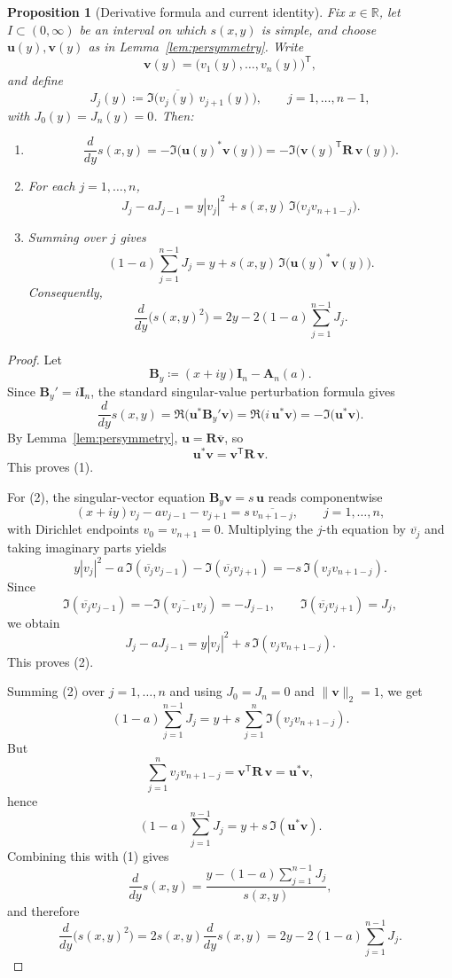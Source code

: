 \documentclass[11pt]{article}
\newtheorem{proposition}[theorem]{Proposition}
\begin{document}
\begin{proposition}[Derivative formula and current identity]\label{prop:current-identity}
Fix \(x\in\mathbb R\), let \(I\subset(0,\infty)\) be an interval on which \(s(x,y)\) is simple, and choose \(\mathbf u(y),\mathbf v(y)\) as in Lemma~\ref{lem:persymmetry}.  Write
\[
\mathbf v(y)=\bigl(v_1(y),\dots,v_n(y)\bigr)^{\mathsf T},
\]
and define
\[
J_j(y)\coloneqq \Im\!\bigl(\overline{v_j(y)}\,v_{j+1}(y)\bigr),
\qquad
j=1,\dots,n-1,
\]
with \(J_0(y)=J_n(y)=0\). Then:
\begin{enumerate}
\item
\[
\frac{d}{dy}s(x,y)
=
-\Im\!\bigl(\mathbf u(y)^*\mathbf v(y)\bigr)
=
-\Im\!\bigl(\mathbf v(y)^{\mathsf T}\mathbf R\,\mathbf v(y)\bigr).
\]
\item For each \(j=1,\dots,n\),
\[
J_j-aJ_{j-1}
=
y|v_j|^2+s(x,y)\,\Im\!\bigl(v_jv_{n+1-j}\bigr).
\]
\item Summing over \(j\) gives
\[
(1-a)\sum_{j=1}^{n-1}J_j
=
y+s(x,y)\,\Im\!\bigl(\mathbf u(y)^*\mathbf v(y)\bigr).
\]
Consequently,
\[
\frac{d}{dy}\bigl(s(x,y)^2\bigr)
=
2y-2(1-a)\sum_{j=1}^{n-1}J_j.
\]
\end{enumerate}
\end{proposition}

\begin{proof}
Let
\[
\mathbf B_y\coloneqq (x+iy)\mathbf I_n-\mathbf A_n(a).
\]
Since \(\mathbf B_y' = i\mathbf I_n\), the standard singular-value perturbation formula gives
\[
\frac{d}{dy}s(x,y)
=
\Re\!\bigl(\mathbf u^* \mathbf B_y' \mathbf v\bigr)
=
\Re\!\bigl(i\,\mathbf u^*\mathbf v\bigr)
=
-\Im\!\bigl(\mathbf u^*\mathbf v\bigr).
\]
By Lemma~\ref{lem:persymmetry}, \(\mathbf u=\mathbf R\overline{\mathbf v}\), so
\[
\mathbf u^*\mathbf v
=
\mathbf v^{\mathsf T}\mathbf R\,\mathbf v.
\]
This proves (1).

For (2), the singular-vector equation \(\mathbf B_y\mathbf v=s\,\mathbf u\) reads
componentwise
\[
(x+iy)v_j-a v_{j-1}-v_{j+1}
=
s\,\overline{v_{n+1-j}},
\qquad
j=1,\dots,n,
\]
with Dirichlet endpoints \(v_0=v_{n+1}=0\). Multiplying the \(j\)-th equation by \(\overline{v_j}\) and taking imaginary parts yields
\[
y|v_j|^2-a\,\Im(\overline{v_j}v_{j-1})-\Im(\overline{v_j}v_{j+1})
=
-s\,\Im(v_jv_{n+1-j}).
\]
Since
\[
\Im(\overline{v_j}v_{j-1})=-\Im(\overline{v_{j-1}}v_j)=-J_{j-1},
\qquad
\Im(\overline{v_j}v_{j+1})=J_j,
\]
we obtain
\[
J_j-aJ_{j-1}
=
y|v_j|^2+s\,\Im(v_jv_{n+1-j}).
\]
This proves (2).

Summing (2) over \(j=1,\dots,n\) and using \(J_0=J_n=0\) and \(\|\mathbf v\|_2=1\), we get
\[
(1-a)\sum_{j=1}^{n-1}J_j
=
y+s\,\sum_{j=1}^n \Im(v_jv_{n+1-j}).
\]
But
\[
\sum_{j=1}^n v_jv_{n+1-j}
=
\mathbf v^{\mathsf T}\mathbf R\,\mathbf v
=
\mathbf u^*\mathbf v,
\]
hence
\[
(1-a)\sum_{j=1}^{n-1}J_j
=
y+s\,\Im(\mathbf u^*\mathbf v).
\]
Combining this with (1) gives
\[
\frac{d}{dy}s(x,y)
=
\frac{y-(1-a)\sum_{j=1}^{n-1}J_j}{s(x,y)},
\]
and therefore
\[
\frac{d}{dy}\bigl(s(x,y)^2\bigr)
=
2s(x,y)\frac{d}{dy}s(x,y)
=
2y-2(1-a)\sum_{j=1}^{n-1}J_j.
\]
\end{proof}
\end{document}
